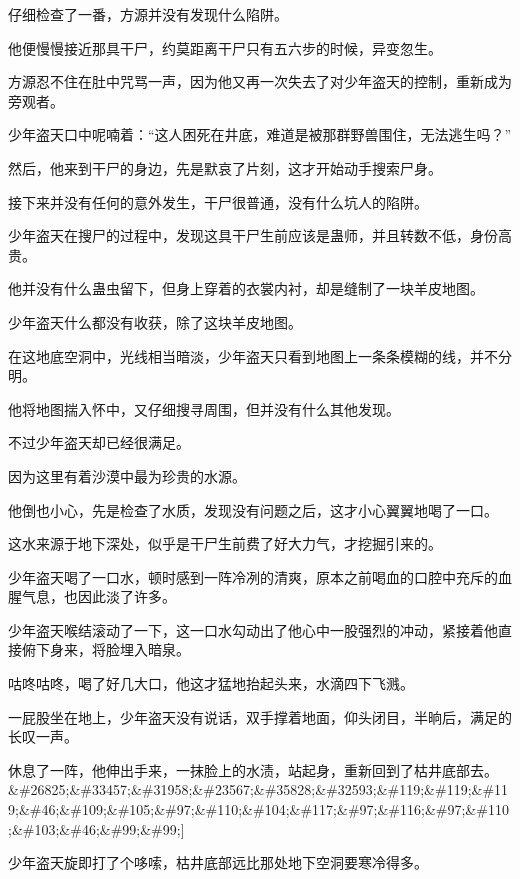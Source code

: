 
\begin{this_body}

仔细检查了一番，方源并没有发现什么陷阱。

他便慢慢接近那具干尸，约莫距离干尸只有五六步的时候，异变忽生。

方源忍不住在肚中咒骂一声，因为他又再一次失去了对少年盗天的控制，重新成为旁观者。

少年盗天口中呢喃着：“这人困死在井底，难道是被那群野兽围住，无法逃生吗？”

然后，他来到干尸的身边，先是默哀了片刻，这才开始动手搜索尸身。

接下来并没有任何的意外发生，干尸很普通，没有什么坑人的陷阱。

少年盗天在搜尸的过程中，发现这具干尸生前应该是蛊师，并且转数不低，身份高贵。

他并没有什么蛊虫留下，但身上穿着的衣裳内衬，却是缝制了一块羊皮地图。

少年盗天什么都没有收获，除了这块羊皮地图。

在这地底空洞中，光线相当暗淡，少年盗天只看到地图上一条条模糊的线，并不分明。

他将地图揣入怀中，又仔细搜寻周围，但并没有什么其他发现。

不过少年盗天却已经很满足。

因为这里有着沙漠中最为珍贵的水源。

他倒也小心，先是检查了水质，发现没有问题之后，这才小心翼翼地喝了一口。

这水来源于地下深处，似乎是干尸生前费了好大力气，才挖掘引来的。

少年盗天喝了一口水，顿时感到一阵冷冽的清爽，原本之前喝血的口腔中充斥的血腥气息，也因此淡了许多。

少年盗天喉结滚动了一下，这一口水勾动出了他心中一股强烈的冲动，紧接着他直接俯下身来，将脸埋入暗泉。

咕咚咕咚，喝了好几大口，他这才猛地抬起头来，水滴四下飞溅。

一屁股坐在地上，少年盗天没有说话，双手撑着地面，仰头闭目，半晌后，满足的长叹一声。

休息了一阵，他伸出手来，一抹脸上的水渍，站起身，重新回到了枯井底部去。\&\#26825;\&\#33457;\&\#31958;\&\#23567;\&\#35828;\&\#32593;\&\#119;\&\#119;\&\#119;\&\#46;\&\#109;\&\#105;\&\#97;\&\#110;\&\#104;\&\#117;\&\#97;\&\#116;\&\#97;\&\#110;\&\#103;\&\#46;\&\#99;\&\#99;]

少年盗天旋即打了个哆嗦，枯井底部远比那处地下空洞要寒冷得多。


\end{this_body}
